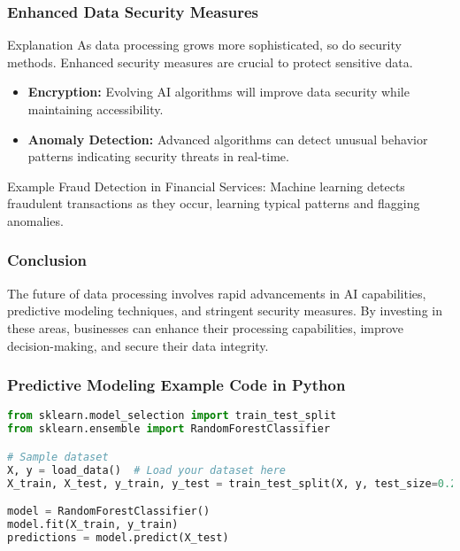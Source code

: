 \documentclass[aspectratio=169]{beamer}
\begin{document}
\begin{frame}[fragile]
    \frametitle{Enhanced Data Security Measures}

    \begin{block}{Explanation}
        As data processing grows more sophisticated, so do security methods. Enhanced security measures are crucial to protect sensitive data.
    \end{block}

    \begin{itemize}
        \item \textbf{Encryption:} Evolving AI algorithms will improve data security while maintaining accessibility.
        \item \textbf{Anomaly Detection:} Advanced algorithms can detect unusual behavior patterns indicating security threats in real-time.
    \end{itemize}

    \begin{block}{Example}
        Fraud Detection in Financial Services: Machine learning detects fraudulent transactions as they occur, learning typical patterns and flagging anomalies.
    \end{block}
\end{frame}

\begin{frame}[fragile]
    \frametitle{Conclusion}

    The future of data processing involves rapid advancements in AI capabilities, predictive modeling techniques, and stringent security measures.
    By investing in these areas, businesses can enhance their processing capabilities, improve decision-making, and secure their data integrity.
\end{frame}

\begin{frame}[fragile]
    \frametitle{Predictive Modeling Example Code in Python}

    \begin{lstlisting}[language=Python]
from sklearn.model_selection import train_test_split
from sklearn.ensemble import RandomForestClassifier

# Sample dataset
X, y = load_data()  # Load your dataset here
X_train, X_test, y_train, y_test = train_test_split(X, y, test_size=0.2)

model = RandomForestClassifier()
model.fit(X_train, y_train)
predictions = model.predict(X_test)
    \end{lstlisting}
\end{frame}
\end{document}
